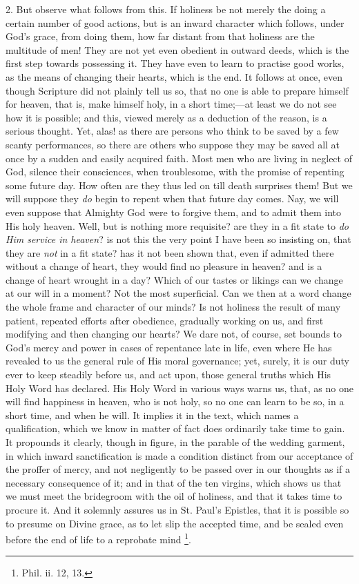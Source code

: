 2. But observe what follows from this. If holiness be
not merely the doing a certain number of good actions,
but is an inward character which follows, under God's
grace, from doing them, how far distant from that
holiness are the multitude of men! They are not yet even
obedient in outward deeds, which is the first step
towards possessing it. They have even to learn to
practise good works, as the means of changing their
hearts, which is the end. It follows at once, even though
Scripture did not plainly tell us so, that no one is able
to prepare himself for heaven, that is, make himself
holy, in a short time;—at least we do not see how it
is possible; and this, viewed merely as a deduction of
the reason, is a serious thought. Yet, alas! as there are
persons who think to be saved by a few scanty
performances, so there are others who suppose they may be
saved all at once by a sudden and easily acquired faith.
Most men who are living in neglect of God, silence their
consciences, when troublesome, with the promise of
repenting some future day. How often are they thus led on
till death surprises them! But we will suppose they \emph{do}
begin to repent when that future day comes. Nay, we will
even suppose that Almighty God were to forgive them, and
to admit them into His holy heaven. Well, but is nothing
more requisite? are they in a fit state to \emph{do Him
service in heaven}? is not this the very point I have
been so insisting on, that they are \emph{not} in a fit
state? has it not been shown that, even if admitted there
without a change of heart, they would find no pleasure in
heaven? and is a change of heart wrought in a day? Which
of our tastes or likings can we change at our will in a
moment? Not the most superficial. Can we then at a word
change the whole frame and character of our minds? Is not
holiness the result of many patient, repeated efforts
after obedience, gradually working on us, and first
modifying and then changing our hearts? We dare not, of
course, set bounds to God's mercy and power in cases of
repentance late in life, even where He has revealed to us
the general rule of His moral governance; yet, surely, it
is our duty ever to keep steadily before us, and act
upon, those general truths which His Holy Word has
declared. His Holy Word in various ways warns us, that,
as no one will find happiness in heaven, who is not holy,
so no one can learn to be so, in a short time, and when
he will. It implies it in the text, which names a
qualification, which we know in matter of fact does
ordinarily take time to gain. It propounds it clearly,
though in figure, in the parable of the wedding garment,
in which inward sanctification is made a condition
distinct from our acceptance of the proffer of mercy, and
not negligently to be passed over in our thoughts as if a
necessary consequence of it; and in that of the ten
virgins, which shows us that we must meet the bridegroom
with the oil of holiness, and that it takes time to
procure it. And it solemnly assures us in St. Paul's Epistles, that it is possible so to presume on Divine
grace, as to let slip the accepted time, and be sealed
even before the end of life to a reprobate mind \footnote{Phil. ii. 12,
13.}.

